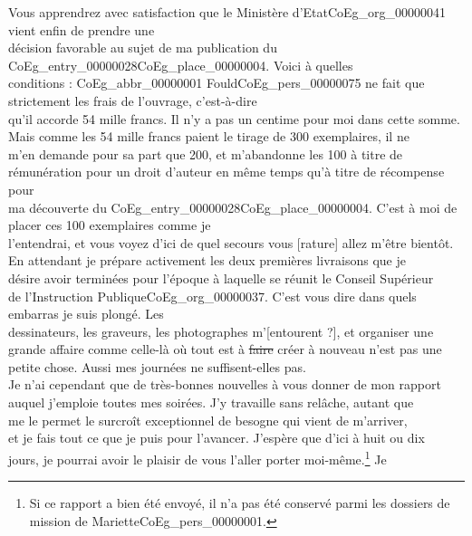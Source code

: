 \documentclass{book}
\begin{document}
{\indent Vous apprendrez avec satisfaction que le Ministère d’Etat\gls{CoEg_org_00000041} vient enfin de prendre une\\
décision favorable au sujet de ma publication du \Gls{CoEg_entry_00000028}\gls{CoEg_place_00000004}. Voici à quelles\\
conditions : \gls{CoEg_abbr_00000001} Fould\gls{CoEg_pers_00000075} ne fait que strictement les frais de l’ouvrage, c’est-à-dire\\
qu’il accorde 54 mille francs. Il n’y a pas un centime pour moi dans cette somme.\\
Mais comme les 54 mille francs paient le tirage de 300 exemplaires, il ne\\
m’en demande pour sa part que 200, et m’abandonne les 100 à titre de\\
rémunération pour un droit d’auteur en même temps qu’à titre de récompense pour\\
ma découverte du \Gls{CoEg_entry_00000028}\gls{CoEg_place_00000004}. C’est à moi de placer ces 100 exemplaires comme je\\
l’entendrai, et vous voyez d’ici de quel secours vous [rature] allez m’être bientôt.\\
\indent En attendant je prépare activement les deux premières livraisons que je\\
désire avoir terminées pour l’époque à laquelle se réunit le Conseil Supérieur\\
de l’Instruction Publique\gls{CoEg_org_00000037}. C’est vous dire dans quels embarras je suis plongé. Les\\
dessinateurs, les graveurs, les photographes m’[entourent ?], et organiser une\\
grande affaire comme celle-là où tout est à \sout{faire} créer à nouveau n’est pas une\\
petite chose. Aussi mes journées ne suffisent-elles pas.\\
\indent Je n’ai cependant que de très-bonnes nouvelles à vous donner de mon rapport\\
auquel j’emploie toutes mes soirées. J’y travaille sans relâche, autant que\\
me le permet le surcroît exceptionnel de besogne qui vient de m’arriver,\\
et je fais tout ce que je puis pour l’avancer. J’espère que d’ici à huit ou dix\\
jours, je pourrai avoir le plaisir de vous l’aller porter moi-même.\footnote{Si ce rapport a bien été envoyé, il n'a pas été conservé parmi les dossiers de mission de Mariette\gls{CoEg_pers_00000001}.} Je\\
}
\end{document}
